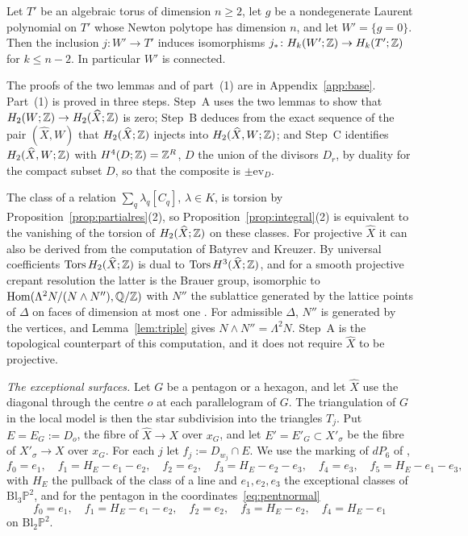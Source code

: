 \begin{lemma}\label{lem:lefschetz}
Let $T'$ be an algebraic torus of dimension $n\ge2$, let $g$ be a nondegenerate Laurent polynomial on $T'$ whose Newton
polytope has dimension $n$, and let $W'=\{g=0\}$. Then the inclusion $j\colon W'\to T'$ induces isomorphisms
$j_*\colon H_k(W';\mathbb Z)\to H_k(T';\mathbb Z)$ for $k\le n-2$. In particular $W'$ is connected.
\end{lemma}

The proofs of the two lemmas and of part~(1) are in Appendix~\ref{app:base}. Part~(1) is proved in three steps. Step~A
uses the two lemmas to show that $H_2(W;\mathbb Z)\to H_2(\widehat X;\mathbb Z)$ is zero; Step~B deduces from the exact sequence of the pair
$(\widehat X,W)$ that $H_2(\widehat X;\mathbb Z)$ injects into $H_2(\widehat X,W;\mathbb Z)$; and Step~C identifies $H_2(\widehat X,W;\mathbb Z)$ with
$H^4(D;\mathbb Z)=\mathbb Z^R$, $D$ the union of the divisors $D_r$, by duality for the compact subset $D$, so that the composite is
$\pm\mathrm{ev}_D$.

\begin{remark}
The class of a relation $\sum_q\lambda_q[C_q]$, $\lambda\in K$, is torsion by Proposition~\ref{prop:partialres}(2), so
Proposition~\ref{prop:integral}(2) is equivalent to the vanishing of the torsion of $H_2(\widehat X;\mathbb Z)$ on these classes.
For projective $\widehat X$ it can also be derived from the computation of Batyrev and Kreuzer. By universal
coefficients $\operatorname{Tors}H_2(\widehat X;\mathbb Z)$ is dual to $\operatorname{Tors}H^3(\widehat X;\mathbb Z)$, and for a smooth projective
crepant resolution the latter is the Brauer group, isomorphic to $\operatorname{Hom}(\Lambda^2N/(N\wedge N''),\mathbb Q/\mathbb Z)$ with $N''$
the sublattice generated by the lattice points of $\Delta$ on faces of dimension at most one \cite[Cor.~3.9]{BK06}. For
admissible $\Delta$, $N''$ is generated by the vertices, and Lemma~\ref{lem:triple} gives $N\wedge N''=\Lambda^2N$. Step~A is
the topological counterpart of this computation, and it does not require $\widehat X$ to be projective.
\end{remark}

\emph{The exceptional surfaces.} Let $G$ be a pentagon or a hexagon, and let $\widehat X$ use the diagonal through the
centre $o$ at each parallelogram of $G$. The triangulation of $G$ in the local model is then the star subdivision into the
triangles $T_j$. Put $E=E_G:=D_o$, the fibre of $\widehat X\to X$ over $x_G$, and let $E'=E'_G\subset X'_\sigma$ be the fibre of
$X'_\sigma\to X$ over $x_G$. For each $j$ let $f_j:=D_{w_j}\cap E$. We use the marking of $dP_6$ of \cite{Paper5},
\begin{equation}\label{eq:marking6}
f_0=e_1,\quad f_1=H_E-e_1-e_2,\quad f_2=e_2,\quad f_3=H_E-e_2-e_3,\quad f_4=e_3,\quad f_5=H_E-e_1-e_3,
\end{equation}
with $H_E$ the pullback of the class of a line and $e_1,e_2,e_3$ the exceptional classes of $\mathrm{Bl}_3\mathbb P^2$, and for the pentagon
in the coordinates~\eqref{eq:pentnormal}
\begin{equation}\label{eq:marking7}
f_0=e_1,\quad f_1=H_E-e_1-e_2,\quad f_2=e_2,\quad f_3=H_E-e_2,\quad f_4=H_E-e_1
\end{equation}
on $\mathrm{Bl}_2\mathbb P^2$.

